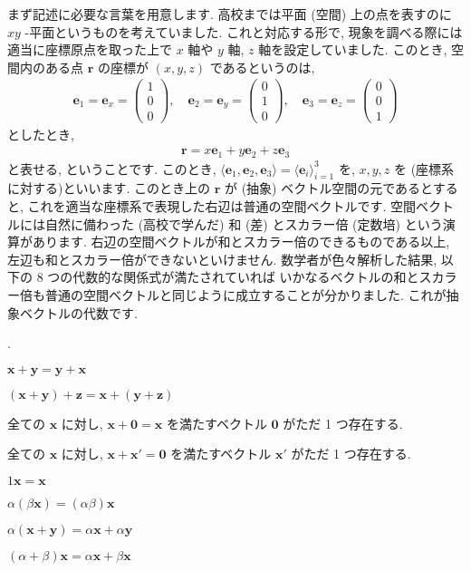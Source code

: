 \documentclass[openany, a4paper, oneside]{book}
\newcounter{enum2}
\renewenvironment{enumerate}{%
\begin{list}%
{%
\arabic{enum2}.\ \,%
}%
{%
\usecounter{enum2}
\setlength{\itemindent}{0pt}%
\setlength{\leftmargin}{6pt}%
\setlength{\rightmargin}{0pt}%
\setlength{\labelsep}{0pt}%
\setlength{\labelwidth}{6pt}%
\setlength{\itemsep}{0pt}%
\setlength{\parsep}{0pt}%
\setlength{\listparindent}{0pt}%
}
}{%
\end{list}%
}
\theoremstyle{break}
\theoremstyle{breakdefn}
\begin{document}
まず記述に必要な言葉を用意します.
高校までは平面 (空間) 上の点を表すのに $xy$ -平面というものを考えていました.
これと対応する形で, 現象を調べる際には適当に座標原点を取った上で $x$ 軸や $y$ 軸,  $z$ 軸を設定していました.
このとき, 空間内のある点 $\bm{r}$ の座標が $(x,y,z)$ であるというのは,
    \begin{align}
        \bm{e}_1
        =
        \bm{e}_x
        =
        \begin{pmatrix}
            1 \\ 0 \\ 0
        \end{pmatrix},
        \quad
        \bm{e}_2
        =
        \bm{e}_y
        =
        \begin{pmatrix}
            0 \\ 1 \\ 0
        \end{pmatrix},
        \quad
        \bm{e}_3
        =
        \bm{e}_z
        =
        \begin{pmatrix}
            0 \\ 0 \\ 1
        \end{pmatrix}
    \end{align}
としたとき,
    \begin{align}
        \bm{r}
        =
        x \bm{e}_1 + y \bm{e}_2 + z \bm{e}_3
    \end{align}
と表せる, ということです.
このとき,
$\langle \bm{e}_1 , \bm{e}_2, \bm{e}_3 \rangle = \langle \bm{e}_i \rangle _{i=1}^3$
を, $x,y,z$ を (座標系に対する)といいます.
このとき上の $\bm{r}$ が (抽象) ベクトル空間の元であるとすると,
これを適当な座標系で表現した右辺は普通の空間ベクトルです.
空間ベクトルには自然に備わった (高校で学んだ) 和 (差) とスカラー倍 (定数培) という演算があります.
右辺の空間ベクトルが和とスカラー倍のできるものである以上, 左辺も和とスカラー倍ができないといけません.
数学者が色々解析した結果, 以下の 8 つの代数的な関係式が満たされていれば
いかなるベクトルの和とスカラー倍も普通の空間ベクトルと同じように成立することが分かりました.
これが抽象ベクトルの代数です.
\begin{enumerate}
\item  $\bm{x} + \bm{y} = \bm{y} + \bm{x}$
\item  $(\bm{x} + \bm{y} ) + \bm{z} = \bm{x} + ( \bm{y} + \bm{z})$
\item 全ての $\bm{x}$ に対し,  $\bm{x} + \bm{0} = \bm{x}$ を満たすベクトル $\bm{0}$ がただ 1 つ存在する.
\item 全ての $\bm{x}$ に対し,  $\bm{x} + \bm{x}' = \bm{0}$ を満たすベクトル $\bm{x}'$ がただ 1 つ存在する.
\item  $1\bm{x} = \bm{x}$
\item  $\alpha (\beta \bm{x}) = (\alpha \beta) \bm{x}$
\item  $\alpha (\bm{x} + \bm{y} ) = \alpha \bm{x} + \alpha \bm{y}$
\item  $(\alpha + \beta ) \bm{x} = \alpha \bm{x} + \beta \bm{x}$
\end{enumerate}
\end{document}
